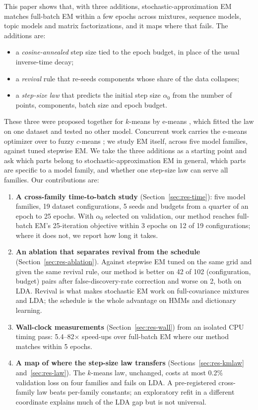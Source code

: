 \documentclass[10pt]{article}
\begin{document}
This paper shows that, with three additions, stochastic-approximation EM matches full-batch EM within a few epochs
across mixtures, sequence models, topic models and matrix factorizations, and it maps where that fails. The additions
are:
\begin{itemize}[nosep]
  \item a \emph{cosine-annealed} step size tied to the epoch budget, in place of the usual inverse-time decay;
  \item a \emph{revival} rule that re-seeds components whose share of the data collapses;
  \item a \emph{step-size law} that predicts the initial step size $\alpha_0$ from the number of points, components,
        batch size and epoch budget.
\end{itemize}
These three were proposed together for $k$-means by e-means \citep{bessa2026emeans}, which fitted the law on one
dataset and tested no other model. Concurrent work carries the e-means optimizer over to fuzzy $c$-means
\citep{tiwari2026fuzzy}; we study EM itself, across five model families, against tuned stepwise EM. We take the
three additions as a starting point and ask which parts belong to
stochastic-approximation EM in general, which parts are specific to a model family, and whether one step-size law
can serve all families. Our contributions are:
\begin{enumerate}[nosep]
  \item \textbf{A cross-family time-to-batch study} (Section~\ref{sec:res-time}): five model families, 19 dataset
        configurations, 5 seeds and budgets from a quarter of an epoch to 25 epochs. With $\alpha_0$ selected on
        validation, our method reaches full-batch EM's 25-iteration objective within 3 epochs on 12 of 19
        configurations; where it does not, we report how long it takes.
  \item \textbf{An ablation that separates revival from the schedule} (Section~\ref{sec:res-ablation}). Against
        stepwise EM tuned on the same grid and given the same revival rule, our method is better on 42 of 102
        (configuration, budget) pairs after false-discovery-rate correction and worse on 2, both on LDA. Revival is
        what makes stochastic EM work on full-covariance mixtures and LDA; the schedule is the whole advantage on
        HMMs and dictionary learning.
  \item \textbf{Wall-clock measurements} (Section~\ref{sec:res-wall}) from an isolated CPU timing pass: 5.4--82$\times$
        speed-ups over full-batch EM where our method matches within 5 epochs.
  \item \textbf{A map of where the step-size law transfers} (Sections~\ref{sec:res-kmlaw} and~\ref{sec:res-law}).
        The $k$-means law, unchanged, costs at most 0.2\% validation loss on four families and fails on LDA. A
        pre-registered cross-family law beats per-family constants; an exploratory refit in a different coordinate
        explains much of the LDA gap but is not universal.
\end{enumerate}
\end{document}
